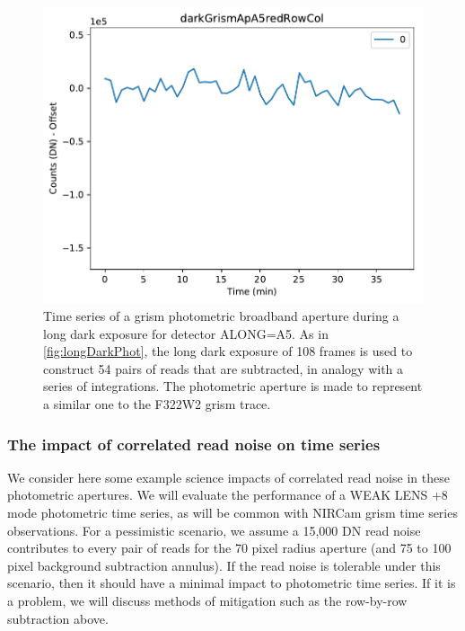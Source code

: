 \documentclass{aastex62}
\begin{document}
\begin{figure}[!hbtp]
\includegraphics[width=.32\columnwidth]{long_dark_darkGrismApA5redRowCol.pdf}
\caption{Time series of a grism photometric broadband aperture during a long dark exposure for detector ALONG=A5. As in \ref{fig:longDarkPhot}, the long dark exposure of 108 frames is used to construct 54 pairs of reads that are subtracted, in analogy with a series of integrations.
The photometric aperture is made to represent a similar one to the F322W2 grism trace.
}\label{fig:longDarkGrism}
\end{figure}


\subsubsection{The impact of correlated read noise on time series}
We consider here some example science impacts of correlated read noise in these photometric apertures.
We will evaluate the performance of a WEAK LENS +8 mode photometric time series, as will be common with NIRCam grism time series observations.
For a pessimistic scenario, we assume a 15,000 DN read noise contributes to every pair of reads for the 70 pixel radius aperture (and 75 to 100 pixel background subtraction annulus).
If the read noise is tolerable under this scenario, then it should have a minimal impact to photometric time series.
If it is a problem, we will discuss methods of mitigation such as the row-by-row subtraction above.
\end{document}
